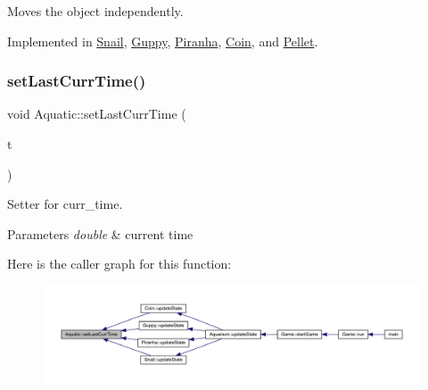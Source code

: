 Moves the object independently. 



Implemented in \mbox{\hyperlink{class_snail_af5892ec122d9199480c813b74488256b}{Snail}}, \mbox{\hyperlink{class_guppy_ae6002948d74b3741bed34a7311be4377}{Guppy}}, \mbox{\hyperlink{class_piranha_a6b86e73b3e5a57ee0fdb768c24ab9b67}{Piranha}}, \mbox{\hyperlink{class_coin_ab62bca5834489b9b483deaa3ca3470e9}{Coin}}, and \mbox{\hyperlink{class_pellet_a7385101b04083be663ae465c38fd2a4d}{Pellet}}.

\mbox{\label{class_aquatic_ae2fa11b1ff4a3763a7a7bd4924f6c1eb}} 
\subsubsection{\texorpdfstring{set\+Last\+Curr\+Time()}{setLastCurrTime()}}
{\footnotesize\ttfamily void Aquatic\+::set\+Last\+Curr\+Time (\begin{DoxyParamCaption}\item[{double}]{t }\end{DoxyParamCaption})}



Setter for curr\+\_\+time. 


\begin{DoxyParams}{Parameters}
{\em double} & current time \\
\hline
\end{DoxyParams}
Here is the caller graph for this function\+:\nopagebreak
\begin{figure}[H]
\begin{center}
\leavevmode
\includegraphics[width=350pt]{class_aquatic_ae2fa11b1ff4a3763a7a7bd4924f6c1eb_icgraph}
\end{center}
\end{figure}
\mbox{\label{class_aquatic_a50e51e4b7bfd7f46d3c43bde27e0a5d8}} 
